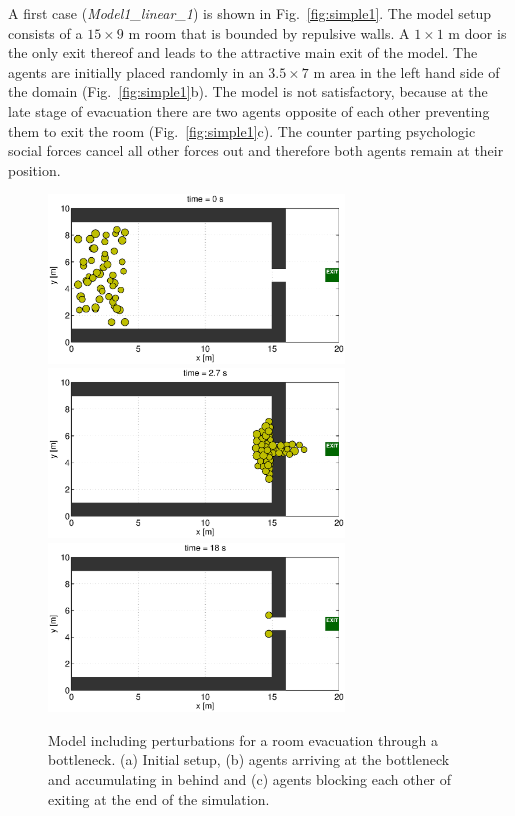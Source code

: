 \documentclass[11pt]{article}
\begin{document}
A first case ({\it Model1\_linear\_1}) is shown in Fig.~\ref{fig:simple1}. The model setup consists of a $15\times9$ m room that is bounded by repulsive walls. A $1\times1$ m door is the only exit thereof and leads to the attractive main exit of the model. The agents are initially placed randomly in an $3.5\times7$ m area in the left hand side of the domain (Fig.~\ref{fig:simple1}b). The model is not satisfactory, because at the late stage of evacuation there are two agents opposite of each other preventing them to exit the room (Fig.~\ref{fig:simple1}c). The counter parting psychologic social forces cancel all other forces out and therefore both agents remain at their position.

\begin{figure}
	\begin{center}
	\includegraphics[width=0.7\textwidth]
	{figures/Model1_direct_2_000000.eps}
	\qquad
	\includegraphics[width=0.7\textwidth]
	{figures/Model1_direct_2_000270.eps}
	\qquad
	\includegraphics[width=0.7\textwidth]
	{figures/Model1_direct_2_001800.eps}
	\caption{Model including perturbations for a room evacuation through a bottleneck. (a) Initial setup, (b) agents arriving at the bottleneck and accumulating in behind and (c) agents blocking each other of exiting at the end of the simulation.}
	\label{fig:simple2}
	\end{center}
\end{figure}
\end{document}
